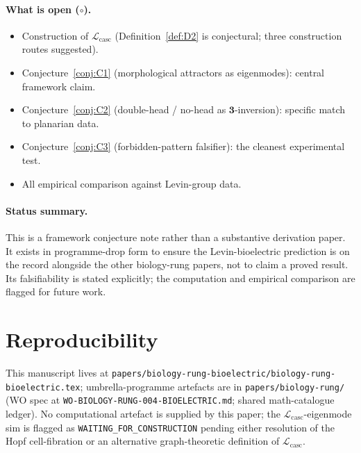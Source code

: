 \documentclass[12pt]{article}
\newcommand{\Lcasc}{\mathcal{L}_{\mathrm{casc}}}
\begin{document}
\paragraph{What is open ($\circ$).}
\begin{itemize}
\item Construction of $\Lcasc$ (Definition~\ref{def:D2} is
  conjectural; three construction routes suggested).
\item Conjecture~\ref{conj:C1} (morphological attractors as
  eigenmodes): central framework claim.
\item Conjecture~\ref{conj:C2} (double-head / no-head as
  $\mathbf{3}$-inversion): specific match to planarian data.
\item Conjecture~\ref{conj:C3} (forbidden-pattern falsifier):
  the cleanest experimental test.
\item All empirical comparison against Levin-group data.
\end{itemize}

\paragraph{Status summary.} This is a framework conjecture
note rather than a substantive derivation paper. It exists in
programme-drop form to ensure the Levin-bioelectric prediction is
on the record alongside the other biology-rung papers, not to
claim a proved result. Its falsifiability is stated explicitly;
the computation and empirical comparison are flagged for future
work.

\section{Reproducibility}\label{sec:repro}

This manuscript lives at
\texttt{papers/biology-rung-bioelectric/biology-rung-bioelectric.tex};
umbrella-programme artefacts are in \texttt{papers/biology-rung/}
(WO spec at \texttt{WO-BIOLOGY-RUNG-004-BIOELECTRIC.md}; shared
math-catalogue ledger). No computational artefact is supplied by
this paper; the $\Lcasc$-eigenmode sim is flagged as
\texttt{WAITING\_FOR\_CONSTRUCTION} pending either resolution of
the Hopf cell-fibration or an alternative graph-theoretic
definition of $\Lcasc$.
\end{document}
